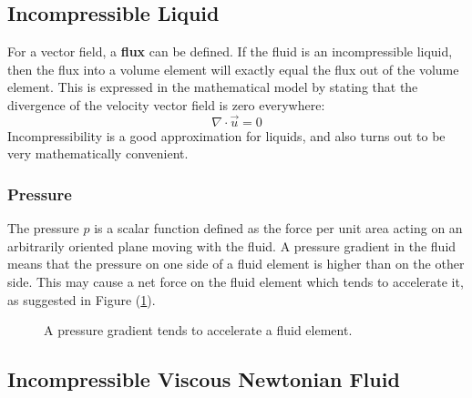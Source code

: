 \documentclass[12pt, a4paper, twoside, openright]{book}
\begin{document}
\subsection{Incompressible Liquid}

For a vector field, a \textbf{flux} can be defined.  If the fluid is an incompressible liquid, then the flux into a volume element will exactly equal the flux out of the volume element.  This is expressed in the mathematical model by stating that the  divergence of the velocity vector field is zero everywhere:
\begin{equation}
\nabla \cdot \vec{u} = 0
\end{equation}
Incompressibility is a good approximation for liquids, and also turns out to be very mathematically convenient.


\subsubsection{Pressure}

The pressure $p$ is a scalar function defined as the force per unit area acting 
on an arbitrarily oriented plane moving with the fluid.
A pressure gradient in the fluid means that the pressure on one side of a fluid element is higher than on the other side.  This may cause a net force on the fluid element which tends to accelerate it, as suggested in Figure (\ref{pressure}).

\begin{figure}[ht]
\centering
{}
\caption{A pressure gradient tends to accelerate a fluid element.}\label{pressure}
\end{figure}


\clearpage
\subsection{Incompressible Viscous Newtonian Fluid}
\end{document}
